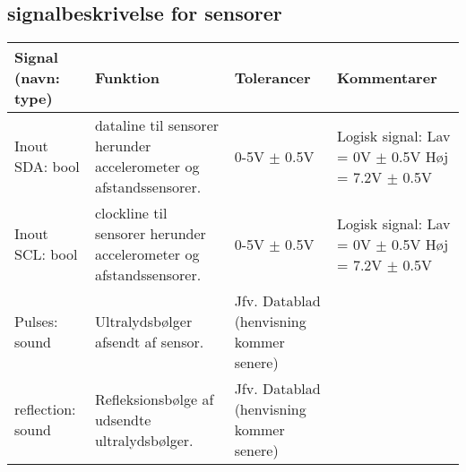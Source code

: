 \subsection{signalbeskrivelse for sensorer}

\begin{table}[h]
	\centering
	\begin{tabularx}{\textwidth}{|l|X|X|X|} \hline
	\textbf{Signal (navn: type)} & \textbf{Funktion} & \textbf{Tolerancer} & \textbf{Kommentarer} \\ \hline
Inout SDA: bool
	& \IIC dataline til sensorer herunder accelerometer og afstandssensorer. 
	& 0-5V $\pm$ 0.5V
 	& Logisk signal: \newline
		Lav = 0V $\pm$ 0.5V \newline
		Høj = 7.2V $\pm$ 0.5V
	\\ \hline

Inout SCL: bool
	& \IIC clockline  til sensorer herunder accelerometer og afstandssensorer. 
	& 0-5V $\pm$ 0.5V
 	& Logisk signal: \newline
		Lav = 0V $\pm$ 0.5V \newline
		Høj = 7.2V $\pm$ 0.5V
	\\ \hline

Pulses: sound
	& Ultralydsbølger afsendt af sensor. 
	& Jfv. Datablad (henvisning kommer senere) %
 	& ~
	\\ \hline
	
reflection: sound
	& Refleksionsbølge af udsendte ultralydsbølger. 
	& Jfv. Datablad (henvisning kommer senere) %
 	& ~
	\\ \hline
	\end{tabularx}
\end{table}